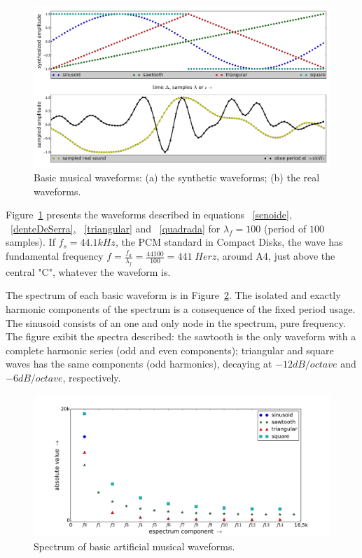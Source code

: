 \documentclass[
 aip,
 jmp,
 amsmath,amssymb,
 reprint,
]{revtex4-1}
\begin{document}
\begin{figure}
    \centering
        \includegraphics[width=\textwidth]{figures/waveForms_}
    \caption{Basic musical waveforms: (a) the synthetic  waveforms; (b) the real waveforms.}
        \label{fig:formasDeOnda}
\end{figure}

Figure~\ref{fig:formasDeOnda} presents the waveforms described in equations  ~\ref{senoide}, ~\ref{denteDeSerra}, ~\ref{triangular} and ~\ref{quadrada} for $\lambda_f=100$ (period of $100$ samples). If $f_s=44.1kHz$, the PCM standard in Compact Disks, the wave has fundamental frequency $f=\frac{f_a}{\lambda_f}=\frac{44100}{100} = 441 \; Herz$, around A4, just above the central "C", whatever the waveform is.

The spectrum of each basic waveform is in Figure~\ref{fig:espectroDeOndas}. The isolated and exactly harmonic components of the spectrum is a consequence of the fixed period usage. The sinusoid consists of an one and only node in the spectrum, pure frequency. The figure exibit the spectra described: the sawtooth is the only waveform with a complete harmonic series (odd and even components); triangular and square waves has the same components (odd harmonics), decaying at $-12dB/octave$ and $-6dB/octave$, respectively.

\begin{figure}
    \centering
        \includegraphics[width=\columnwidth]{figures/waveSpectrum}
    \caption{Spectrum of basic artificial musical waveforms.}
        \label{fig:espectroDeOndas}
\end{figure}
\end{document}
